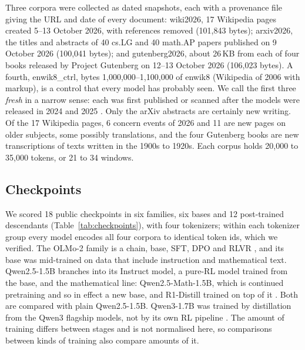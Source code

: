 \documentclass[11pt,a4paper]{article}
\theoremstyle{definition}
\begin{document}
Three corpora were collected as dated snapshots, each with a provenance file giving the URL and date of every
document: wiki2026, 17 Wikipedia pages created 5--13 October 2026, with references removed (101,843 bytes);
arxiv2026, the titles and abstracts of 40 cs.LG and 40 math.AP papers published on 9 October 2026 (100,041 bytes);
and gutenberg2026, about 26\,KB from each of four books released by Project Gutenberg on 12--13 October 2026
(106,023 bytes). A fourth, enwik8\_ctrl, bytes 1,000,000--1,100,000 of enwik8 (Wikipedia of 2006 with markup), is
a control that every model has probably seen. We call the first three \emph{fresh} in a narrow sense: each was
first published or scanned after the models were released in 2024 and 2025
\citep{olmo2024olmo2,qwen2024qwen25,yang2025qwen3,benallal2025smollm2,deepseek2025r1,zeng2025simplerl}. Only the
arXiv abstracts are certainly new writing. Of the 17 Wikipedia pages, 6 concern events of 2026 and 11 are new pages
on older subjects, some possibly translations, and the four Gutenberg books are new transcriptions of texts written
in the 1900s to 1920s. Each corpus holds 20,000 to 35,000 tokens, or 21 to 34 windows.

\subsection{Checkpoints}
\label{sec:checkpoints}

We scored 18 public checkpoints in six families, six bases and 12 post-trained descendants
(Table~\ref{tab:checkpoints}), with four tokenizers; within each tokenizer group every model encodes all four
corpora to identical token ids, which we verified. The OLMo-2 family is a chain, base, SFT, DPO and RLVR
\citep{olmo2024olmo2,lambert2024tulu3}, and its base was mid-trained on data that include instruction and
mathematical text. Qwen2.5-1.5B branches into its Instruct model, a pure-RL model trained from the base, and the
mathematical line: Qwen2.5-Math-1.5B, which is continued pretraining and so in effect a new base, and R1-Distill
trained on top of it \citep{qwen2024qwen25,zeng2025simplerl,deepseek2025r1}. Both are compared with plain
Qwen2.5-1.5B. Qwen3-1.7B was trained by distillation from the Qwen3 flagship models, not by its own RL pipeline
\citep{yang2025qwen3}. The amount of training differs between stages and is not normalised here, so comparisons between kinds of
training also compare amounts of it.
\end{document}
